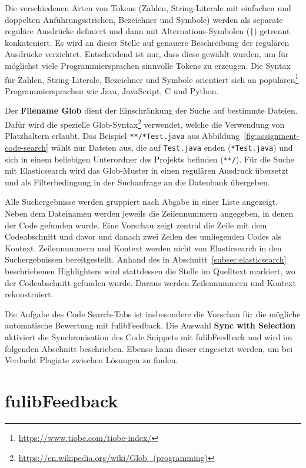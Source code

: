 Die verschiedenen Arten von Tokens (Zahlen, String-Literale mit einfachen und doppelten Anführungsstrichen, Bezeichner und Symbole) werden als separate reguläre Ausdrücke definiert und dann mit Alternations-Symbolen (\texttt{|}) getrennt konkateniert.
Es wird an dieser Stelle auf genauere Beschreibung der regulären Ausdrücke verzichtet.
Entscheidend ist nur, dass diese gewählt wurden, um für möglichst viele Programmiersprachen sinnvolle Tokens zu erzeugen.
Die Syntax für Zahlen, String-Literale, Bezeichner und Symbole orientiert sich an populären\footnote{
    \url{https://www.tiobe.com/tiobe-index/}
} Programmiersprachen wie Java, JavaScript, C und Python.

Der \textbf{Filename Glob} dient der Einschränkung der Suche auf bestimmte Dateien.
Dafür wird die spezielle Glob-Syntax\footnote{
    \url{https://en.wikipedia.org/wiki/Glob_(programming)}
} verwendet, welche die Verwendung von Platzhaltern erlaubt.
Das Beispiel \texttt{**/*Test.java} aus Abbildung~\ref{fig:assignment-code-search} wählt nur Dateien aus, die auf \texttt{Test.java} enden (\texttt{*Test.java}) und sich in einem beliebigen Unterordner des Projekts befinden (\texttt{**/}).
Für die Suche mit Elasticsearch wird das Glob-Muster in einen regulären Ausdruck übersetzt und als Filterbedingung in der Suchanfrage an die Datenbank übergeben.

Alle Suchergebnisse werden gruppiert nach Abgabe in einer Liste angezeigt.
Neben dem Dateinamen werden jeweils die Zeilennummern angegeben, in denen der Code gefunden wurde.
Eine Vorschau zeigt zentral die Zeile mit dem Codeabschnitt und davor und danach zwei Zeilen des umliegenden Codes als Kontext.
Zeilennummern und Kontext werden nicht von Elasticsearch in den Suchergebnissen bereitgestellt.
Anhand des in Abschnitt~\ref{subsec:elasticsearch} beschriebenen Highlighters wird stattdessen die Stelle im Quelltext markiert, wo der Codeabschnitt gefunden wurde.
Daraus werden Zeilennummern und Kontext rekonstruiert.

Die Aufgabe des Code Search-Tabs ist insbesondere die Vorschau für die mögliche automatische Bewertung mit fulibFeedback.
Die Auswahl \textbf{Sync with Selection} aktiviert die Synchronisation des Code Snippets mit fulibFeedback und wird im folgenden Abschnitt beschrieben.
Ebenso kann dieser eingesetzt werden, um bei Verdacht Plagiate zwischen Lösungen zu finden.

\section{fulibFeedback}\label{sec:fulibFeedback}

